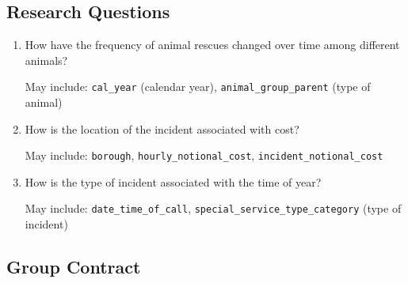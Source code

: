 \documentclass[
  letterpaper,
  DIV=11,
  numbers=noendperiod]{scrartcl}
\begin{document}
\hypertarget{research-questions}{%
\subsection{Research Questions}\label{research-questions}}

\begin{enumerate}
\def\labelenumi{\arabic{enumi}.}
\item
  How have the frequency of animal rescues changed over time among
  different animals?

  May include: \texttt{cal\_year} (calendar year),
  \texttt{animal\_group\_parent} (type of animal)
\item
  How is the location of the incident associated with cost?

  May include: \texttt{borough}, \texttt{hourly\_notional\_cost},
  \texttt{incident\_notional\_cost}
\item
  How is the type of incident associated with the time of year?

  May include: \texttt{date\_time\_of\_call},
  \texttt{special\_service\_type\_category} (type of incident)
\end{enumerate}

\hypertarget{group-contract}{%
\subsection{Group Contract}\label{group-contract}}
\end{document}
